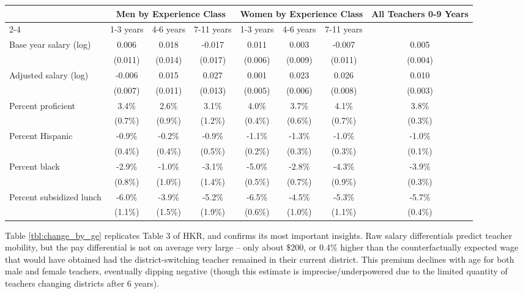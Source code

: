 \documentclass[]{article}
\begin{document}
\begin{sidewaystable}[htbp]
\centering
\begin{tabular}{lccccccc}
  \hline
 & \multicolumn{3}{c}{Men by Experience Class} & \multicolumn{3}{c}{Women by Experience Class} & \multirow{2}{*}{\parbox{0.09\linewidth}{All Teachers 0-9 Years}}\\ \cline{2-4} \cline{5-7}
 & 1-3 years & 4-6 years & 7-11 years & 1-3 years & 4-6 years & 7-11 years &  \\ 
  \hline
Base year salary (log) & 0.006 & 0.018 & -0.017 & 0.011 & 0.003 & -0.007 & 0.005 \\ 
   & (0.011) & (0.014) & (0.017) & (0.006) & (0.009) & (0.011) & (0.004) \\ 
  Adjusted salary (log) & -0.006 & 0.015 & 0.027 & 0.001 & 0.023 & 0.026 & 0.010 \\ 
   & (0.007) & (0.011) & (0.013) & (0.005) & (0.006) & (0.008) & (0.003) \\ 
  Percent proficient & 3.4\% & 2.6\% & 3.1\% & 4.0\% & 3.7\% & 4.1\% & 3.8\% \\ 
   & (0.7\%) & (0.9\%) & (1.2\%) & (0.4\%) & (0.6\%) & (0.7\%) & (0.3\%) \\ 
  Percent Hispanic & -0.9\% & -0.2\% & -0.9\% & -1.1\% & -1.3\% & -1.0\% & -1.0\% \\ 
   & (0.4\%) & (0.4\%) & (0.5\%) & (0.2\%) & (0.3\%) & (0.3\%) & (0.1\%) \\ 
  Percent black & -2.9\% & -1.0\% & -3.1\% & -5.0\% & -2.8\% & -4.3\% & -3.9\% \\ 
   & (0.8\%) & (1.0\%) & (1.4\%) & (0.5\%) & (0.7\%) & (0.9\%) & (0.3\%) \\ 
  Percent subsidized lunch & -6.0\% & -3.9\% & -5.2\% & -6.5\% & -4.5\% & -5.3\% & -5.7\% \\ 
   & (1.1\%) & (1.5\%) & (1.9\%) & (0.6\%) & (1.0\%) & (1.1\%) & (0.4\%) \\ 
   \hline
\end{tabular}
\caption{Average Change in Salary and District Student Characteristics (and Standard Deviations) for Teachers Changing Districts, by Gender and Experience} 
\label{tbl:change_by_ge}
\end{sidewaystable}

Table \ref{tbl:change_by_ge} replicates Table 3 of HKR, and confirms its
most important insights. Raw salary differentials predict teacher
mobility, but the pay differential is not on average very large -- only
about \$200, or 0.4\% higher than the counterfactually expected wage
that would have obtained had the district-switching teacher remained in
their current district. This premium declines with age for both male and
female teachers, eventually dipping negative (though this estimate is
imprecise/underpowered due to the limited quantity of teachers changing
districts after 6 years).
\end{document}
